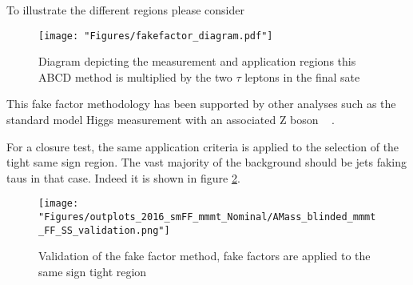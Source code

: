 To illustrate the different regions please consider 
\begin{figure}[ht!b]
  \texttt{[image: "Figures/fakefactor\_diagram.pdf"]}
    \caption{\label{fig:fakefactor_reg} Diagram depicting the measurement and application regions this ABCD method is multiplied by the two $\tau$ leptons in the final sate}
\end{figure}

This fake factor methodology has been supported by other analyses such as the standard model Higgs measurement with an associated Z boson ~\cite{CMS-PAS-HIG-19-010} . 

For a closure test, the same application criteria is applied to the selection of the tight same sign region. The vast majority of the background should be jets faking taus in that case. Indeed it is shown in figure \ref{fig:fakefactor_validation}.
  
\begin{figure}[ht!b]
  \texttt{[image: "Figures/outplots\_2016\_smFF\_mmmt\_Nominal/AMass\_blinded\_mmmt\_FF\_SS\_validation.png"]}
    \caption{\label{fig:fakefactor_validation} Validation of the fake factor method, fake factors are applied to the same sign tight region}
\end{figure}
